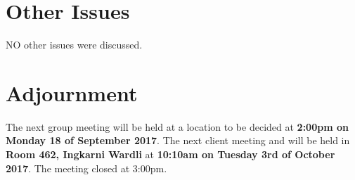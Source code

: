 \documentclass{article}
\begin{document}
\section{Other Issues}
NO other issues were discussed.

\section{Adjournment}
	The next group meeting will be held at a location to be decided at {\bf 2:00pm on Monday 18 of September  2017}.
    \newline
    The next client meeting and will be held in {\bf Room 462, Ingkarni Wardli} at {\bf 10:10am on Tuesday 3rd of October 2017}.
    \newline
The meeting closed at 3:00pm.
\end{document}

